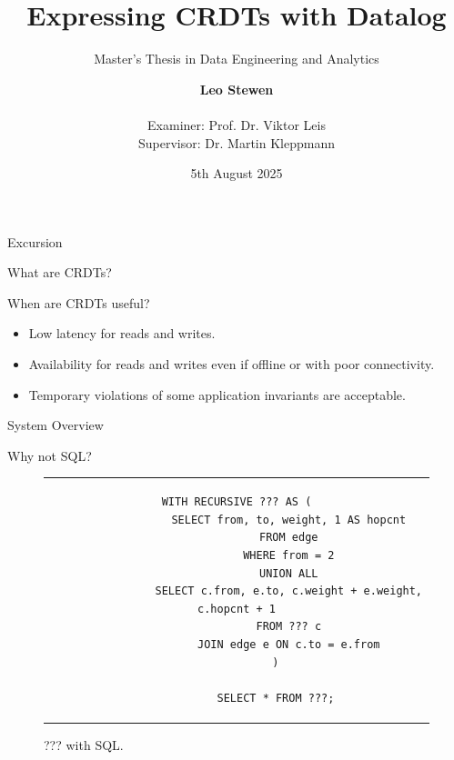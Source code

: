 \documentclass[USenglish,aspectratio=169]{beamer} %
\title{Expressing \acsp{CRDT} with Datalog}
\subtitle{Master's Thesis in Data Engineering and Analytics}
\author{
    \textbf{Leo Stewen} \\ \\
    Examiner: Prof. Dr. Viktor Leis \\
    Supervisor: Dr. Martin Kleppmann \\
}
\date{5th August 2025}
\institute[TUM]{\textbf{Technical University of Munich}}
\begin{document}
\begin{frame}
    \maketitle
\end{frame}

\begin{frame}
    \begin{center}
        Excursion
    \end{center}
\end{frame}

\begin{frame}{What are \acsp{CRDT}?}

\end{frame}

\begin{frame}{When are \acsp{CRDT} useful?}
    \begin{itemize}
        \item Low latency for reads and writes.
        \pause
        \item Availability for reads and writes even if offline or with poor connectivity.
        \pause
        \item Temporary violations of some application invariants are acceptable.
    \end{itemize}
\end{frame}

\begin{frame}{System Overview}
    \begin{figure}
        \centering
        
    \end{figure}
\end{frame}

\begin{frame}[fragile]{Why not SQL?}
    \begin{figure}[h]
        \centering
        \begin{tabular}{c}
        \begin{lstlisting}[keepspaces]
            WITH RECURSIVE ??? AS (
                SELECT from, to, weight, 1 AS hopcnt
                FROM edge
                WHERE from = 2
                UNION ALL
                SELECT c.from, e.to, c.weight + e.weight, c.hopcnt + 1
                FROM ??? c
                JOIN edge e ON c.to = e.from
            )

            SELECT * FROM ???;\end{lstlisting}
        \end{tabular}
        \caption{??? with SQL.}
    \end{figure}
\end{frame}
\end{document}
